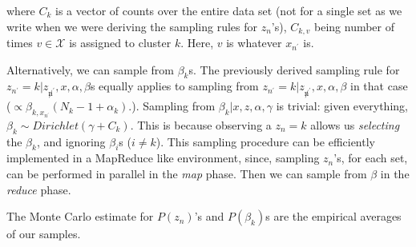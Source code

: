 \documentclass{article}%
\begin{document}
where $C_k$ is a vector of counts over the entire data set (not for a single set as we write when we were deriving the sampling rules for $z_n$'s), $C_{k,v}$ being number of times $v\in \mathcal{X}$ is assigned to cluster $k$. Here, $v$ is whatever $x_{n^\prime}$ is. 

Alternatively, we can sample from $\beta_k$s. The previously derived sampling rule for $z_{n^\prime} = k|z_{\not n^\prime}, x, \alpha, \beta$s equally applies to sampling from  $z_{n^\prime} = k|z_{\not n^\prime}, x, \alpha, \beta$ in that case ($ \propto \beta_{k, x_{n^\prime}} (N_k - 1 + \alpha_k).
$). Sampling from $\beta_k|x,z,\alpha,\gamma$ is trivial: given everything, $\beta_k \sim Dirichlet(\gamma + C_k)$. This is because observing a $z_n = k$ allows us \textit{selecting} the $\beta_k$, and ignoring $\beta_{i}$s ($i\neq k$). This sampling procedure can be efficiently implemented in a MapReduce like environment, since, sampling $z_n$'s, for each set, can be performed in parallel in the \textit{map} phase. Then we can sample from $\beta$ in the \textit{reduce} phase.

The Monte Carlo estimate for $P(z_n)$'s and $P(\beta_k)$s are the empirical averages of our samples.

\end{document}
